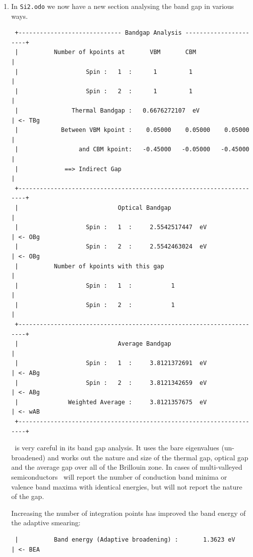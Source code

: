 \documentclass[a4paper,11pt,twoside]{book}
\begin{document}
{\begin{enumerate}
\verb#$ mpirun -np <nprocs> optados.SYSTEM.BUILD.COMMS_ARCH.x86_64 Si2# 

but your MPI implementation may be different.

\item In  \verb#Si2.odo# we now have a new section analysing the band gap in various ways.
\begin{verbatim}
 +----------------------------- Bandgap Analysis ----------------------+
 |          Number of kpoints at       VBM       CBM                   |
 |                   Spin :   1  :      1         1                    |
 |                   Spin :   2  :      1         1                    |
 |               Thermal Bandgap :   0.6676272107  eV                  | <- TBg
 |            Between VBM kpoint :    0.05000    0.05000    0.05000    |
 |                 and CBM kpoint:   -0.45000   -0.05000   -0.45000    |
 |             ==> Indirect Gap                                        |
 +---------------------------------------------------------------------+
 |                            Optical Bandgap                          |
 |                   Spin :   1  :     2.5542517447  eV                | <- OBg
 |                   Spin :   2  :     2.5542463024  eV                | <- OBg
 |          Number of kpoints with this gap                            |
 |                   Spin :   1  :           1                         |
 |                   Spin :   2  :           1                         |
 +---------------------------------------------------------------------+
 |                            Average Bandgap                          |
 |                   Spin :   1  :     3.8121372691  eV                | <- ABg
 |                   Spin :   2  :     3.8121342659  eV                | <- ABg
 |              Weighted Average :     3.8121357675  eV                | <- wAB
 +---------------------------------------------------------------------+
\end{verbatim}

\optados\ is very careful in its band gap analysis. It uses the bare eigenvalues (un-broadened) and works out the nature and size of the thermal gap, optical gap and the average gap over all of the Brillouin zone. In cases of multi-valleyed semiconductors \optados\ will report the number of conduction band minima or valence band maxima with identical energies, but will not report the nature of the gap. 

Increasing the number of integration points has improved the band energy of the adaptive smearing:
\begin{verbatim}
 |          Band energy (Adaptive broadening) :       1.3623 eV        | <- BEA
\end{verbatim}



\end{enumerate}}
\end{document}

